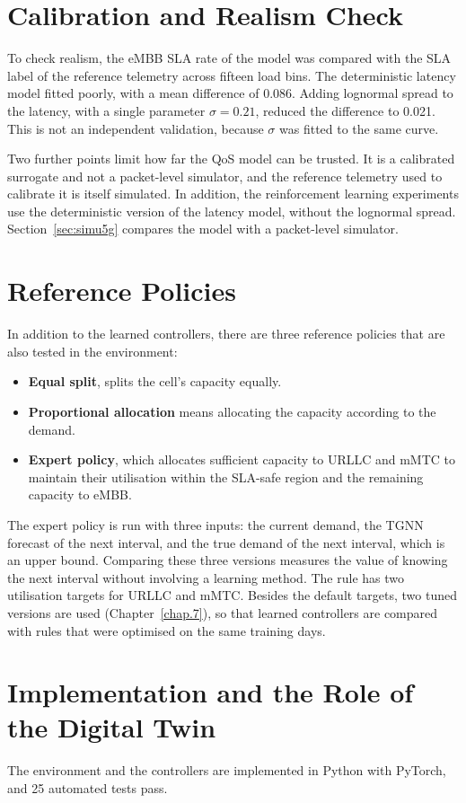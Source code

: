\section{Calibration and Realism Check}
To check realism, the eMBB SLA rate of the model was compared with the SLA label of the reference telemetry across fifteen load bins. The deterministic latency model fitted poorly, with a mean difference of 0.086. Adding lognormal spread to the latency, with a single parameter $\sigma = 0.21$, reduced the difference to 0.021. This is not an independent validation, because $\sigma$ was fitted to the same curve.

Two further points limit how far the QoS model can be trusted. It is a calibrated surrogate and not a packet-level simulator, and the reference telemetry used to calibrate it is itself simulated. In addition, the reinforcement learning experiments use the deterministic version of the latency model, without the lognormal spread. Section~\ref{sec:simu5g} compares the model with a packet-level simulator.

\section{Reference Policies}
In addition to the learned controllers, there are three reference policies that are also tested in the environment:
\begin{itemize}
\item \textbf{Equal split}, splits the cell's capacity equally.
\item \textbf{Proportional allocation} means allocating the capacity according to the demand.
\item \textbf{Expert policy}, which allocates sufficient capacity to URLLC and mMTC to maintain their utilisation within the SLA-safe region and the remaining capacity to eMBB.
\end{itemize}
The expert policy is run with three inputs: the current demand, the TGNN forecast of the next interval, and the true demand of the next interval, which is an upper bound. Comparing these three versions measures the value of knowing the next interval without involving a learning method. The rule has two utilisation targets for URLLC and mMTC. Besides the default targets, two tuned versions are used (Chapter~\ref{chap.7}), so that learned controllers are compared with rules that were optimised on the same training days.

\section{Implementation and the Role of the Digital Twin}
The environment and the controllers are implemented in Python with PyTorch, and 25 automated tests pass.

